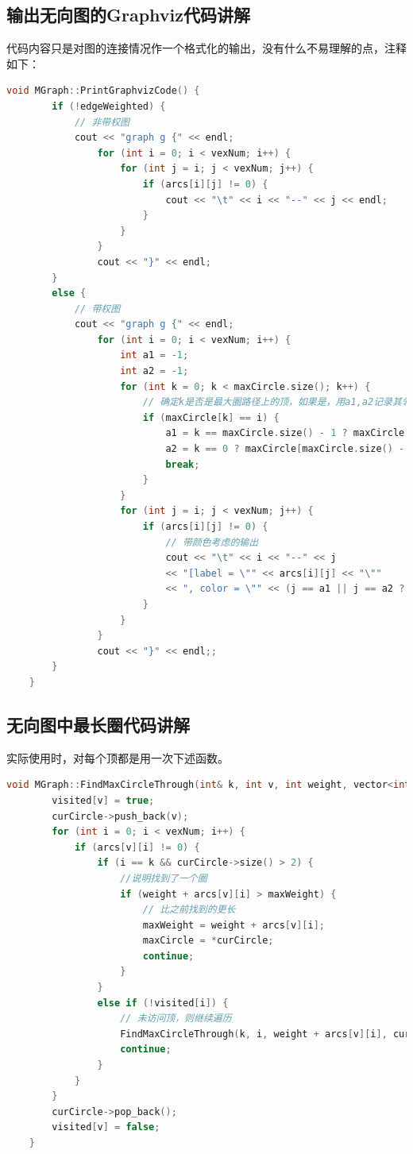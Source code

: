 \documentclass[UTF8]{article}
\begin{document}
	\subsection{输出无向图的Graphviz代码讲解}\par
	代码内容只是对图的连接情况作一个格式化的输出，没有什么不易理解的点，注释如下：\par
	\begin{lstlisting}[language=C++, name=输出无向图的Graphviz代码]
	void MGraph::PrintGraphvizCode() {
		if (!edgeWeighted) {
			// 非带权图
			cout << "graph g {" << endl;
				for (int i = 0; i < vexNum; i++) {
					for (int j = i; j < vexNum; j++) {
						if (arcs[i][j] != 0) {
							cout << "\t" << i << "--" << j << endl;
						}
					}
				}
				cout << "}" << endl;
		}
		else {
			// 带权图
			cout << "graph g {" << endl;
				for (int i = 0; i < vexNum; i++) {
					int a1 = -1;
					int a2 = -1;
					for (int k = 0; k < maxCircle.size(); k++) {
						// 确定k是否是最大圈路径上的顶，如果是，用a1,a2记录其邻顶。
						if (maxCircle[k] == i) {
							a1 = k == maxCircle.size() - 1 ? maxCircle[0] : maxCircle[k + 1];
							a2 = k == 0 ? maxCircle[maxCircle.size() - 1] : maxCircle[k - 1];
							break;
						}
					}
					for (int j = i; j < vexNum; j++) {
						if (arcs[i][j] != 0) {
							// 带颜色考虑的输出
							cout << "\t" << i << "--" << j
							<< "[label = \"" << arcs[i][j] << "\""
							<< ", color = \"" << (j == a1 || j == a2 ? "red" : "black") << "\"]" << endl;
						}
					}
				}
				cout << "}" << endl;;
		}
	}
	\end{lstlisting}
	
	\subsection{无向图中最长圈代码讲解}\par
	实际使用时，对每个顶都是用一次下述函数。\par
	\begin{lstlisting}[language=C++, name=无向图中最长圈代码]
	void MGraph::FindMaxCircleThrough(int& k, int v, int weight, vector<int>* curCircle) {
		visited[v] = true;
		curCircle->push_back(v);
		for (int i = 0; i < vexNum; i++) {
			if (arcs[v][i] != 0) {
				if (i == k && curCircle->size() > 2) {
					//说明找到了一个圈
					if (weight + arcs[v][i] > maxWeight) {
						// 比之前找到的更长
						maxWeight = weight + arcs[v][i];
						maxCircle = *curCircle;
						continue;
					}
				}
				else if (!visited[i]) {
					// 未访问顶，则继续遍历
					FindMaxCircleThrough(k, i, weight + arcs[v][i], curCircle);
					continue;
				}
			}
		}
		curCircle->pop_back();
		visited[v] = false;
	}
	\end{lstlisting}
	
\end{document}
